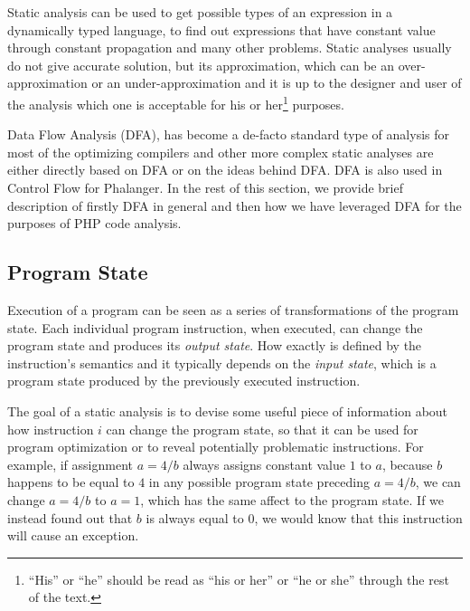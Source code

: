         Static analysis can be used to get possible types of an expression in 
        a dynamically typed language, to find out expressions that have constant 
        value through constant propagation and many other problems. 
        Static analyses usually do not give accurate solution, but 
        its approximation, which can be an over-approximation or 
        an under-approximation and it is up to the designer and user of the analysis 
        which one is acceptable for his or her\footnote{``His'' or ``he'' 
        should be read as ``his or her'' or ``he or she'' through the rest of the text.} 
        purposes.

        Data Flow Analysis (DFA)\cite{aho1985compilers}, \cite{nielson1999principles} has 
        become a de-facto standard type of analysis for most of the optimizing compilers and 
        other more complex static analyses are either directly based on DFA or on 
        the ideas behind DFA. DFA is also used in Control Flow for Phalanger. 
        In the rest of this section, we provide brief description of 
        firstly DFA in general and then how we have leveraged DFA for 
        the purposes of PHP code analysis.
        
        \subsection{Program State}
        Execution of a program can be seen as a series of transformations of 
        the program state. Each individual program instruction, when executed, 
        can change the program state and produces its \emph{output state}.         
        How exactly is defined by the instruction's semantics and it typically 
        depends on the \emph{input state}, which is a program state produced 
        by the previously executed instruction. 
        
        The goal of a static analysis is to devise some useful piece of information 
        about how instruction $i$ can change the program state, so that it can 
        be used for program optimization or to reveal potentially problematic 
        instructions. For example, if assignment $a=4/b$ always assigns 
        constant value $1$ to $a$, because $b$ happens to be equal to $4$ 
        in any possible program state preceding $a=4/b$, we can change 
        $a=4/b$ to $a=1$, which has the same affect to the program state. 
        If we instead found out that $b$ is always equal to $0$, we would 
        know that this instruction will cause an exception.
        

